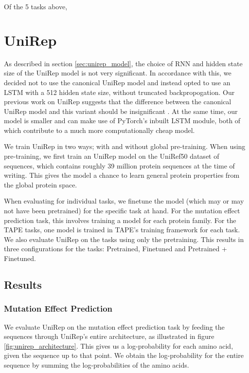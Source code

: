 Of the 5 tasks above, 

\section{UniRep}
\label{sec:unirep_experiment}
As described in section \ref{sec:unirep_model}, the choice of RNN and hidden state size of the UniRep model is not very significant. In accordance with this, we decided not to use the canonical UniRep model and instead opted to use an LSTM with a 512 hidden state size, without truncated backpropogation. Our previous work on UniRep suggests that the difference between the canonical UniRep model and this variant should be insignificant \cite{unirepproject}. At the same time, our model is smaller and can make use of PyTorch's inbuilt LSTM module, both of which contribute to a much more computationally cheap model.

We train UniRep in two ways; with and without global pre-training. When using pre-training, we first train an UniRep model on the UniRef50 dataset of sequences, which contains roughly 39 million protein sequences at the time of writing. This gives the model a chance to learn general protein properties from the global protein space.

When evaluating for individual tasks, we finetune the model (which may or may not have been pretrained) for the specific task at hand. For the mutation effect prediction task, this involves training a model for each protein family. For the TAPE tasks, one model is trained in TAPE's training framework for each task. We also evaluate UniRep on the tasks using only the pretraining. This results in three configurations for the tasks: Pretrained, Finetuned and Pretrained + Finetuned.

\subsection{Results}
\subsubsection{Mutation Effect Prediction}
We evaluate UniRep on the mutation effect prediction task by feeding the sequences through UniRep's entire architecture, as illustrated in figure \ref{fig:unirep_architecture}. This gives us a log-probability for each amino acid, given the sequence up to that point. We obtain the log-probability for the entire sequence by summing the log-probabilities of the amino acids.

